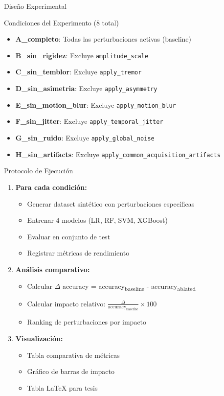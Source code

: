 \documentclass[aspectratio=169]{beamer}
\begin{document}
\begin{frame}{Diseño Experimental}
\begin{block}{Condiciones del Experimento (8 total)}
\begin{itemize}
\item \textbf{A\_completo}: Todas las perturbaciones activas (baseline)
\item \textbf{B\_sin\_rigidez}: Excluye \texttt{amplitude\_scale}
\item \textbf{C\_sin\_temblor}: Excluye \texttt{apply\_tremor}
\item \textbf{D\_sin\_asimetria}: Excluye \texttt{apply\_asymmetry}
\item \textbf{E\_sin\_motion\_blur}: Excluye \texttt{apply\_motion\_blur}
\item \textbf{F\_sin\_jitter}: Excluye \texttt{apply\_temporal\_jitter}
\item \textbf{G\_sin\_ruido}: Excluye \texttt{apply\_global\_noise}
\item \textbf{H\_sin\_artifacts}: Excluye \texttt{apply\_common\_acquisition\_artifacts}
\end{itemize}
\end{block}
\end{frame}

\begin{frame}{Protocolo de Ejecución}
\begin{enumerate}
\item \textbf{Para cada condición:}
\begin{itemize}
\item Generar dataset sintético con perturbaciones específicas
\item Entrenar 4 modelos (LR, RF, SVM, XGBoost)
\item Evaluar en conjunto de test
\item Registrar métricas de rendimiento
\end{itemize}

\vspace{0.3cm}

\item \textbf{Análisis comparativo:}
\begin{itemize}
\item Calcular $\Delta$ accuracy = accuracy\textsubscript{baseline} - accuracy\textsubscript{ablated}
\item Calcular impacto relativo: $\frac{\Delta}{\text{accuracy}_{\text{baseline}}} \times 100$
\item Ranking de perturbaciones por impacto
\end{itemize}

\vspace{0.3cm}

\item \textbf{Visualización:}
\begin{itemize}
\item Tabla comparativa de métricas
\item Gráfico de barras de impacto
\item Tabla LaTeX para tesis
\end{itemize}
\end{enumerate}
\end{frame}
\end{document}
